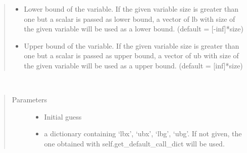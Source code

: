 \documentclass[letterpaper,10pt,english]{sphinxmanual}
\begin{document}
\begin{fulllineitems}
\begin{fulllineitems}
\begin{quote}
\begin{description}
\begin{itemize}
\item {} 
 \textendash{} Lower bound of the variable. If the given variable size is greater than one but a scalar is passed as
lower bound, a vector of lb with size of the given variable will be used as a lower bound.
(default = {[}-inf{]}*size)

\item {} 
 \textendash{} Upper bound of the variable. If the given variable size is greater than one but a scalar is passed as
upper bound, a vector of ub  with size of the given variable will be used as a upper bound.
(default = {[}inf{]}*size)

\end{itemize}

\end{description}\end{quote}

\end{fulllineitems}


\begin{fulllineitems}
\label{\detokenize{yaocptool.optimization:yaocptool.optimization.abstract_optimization_problem.AbstractOptimizationProblem.set_objective}}
\end{fulllineitems}


\begin{fulllineitems}
\label{\detokenize{yaocptool.optimization:yaocptool.optimization.abstract_optimization_problem.AbstractOptimizationProblem.solve}}~\begin{quote}\begin{description}
\item[{Parameters}] \leavevmode\begin{itemize}
\item {} 
 \textendash{} Initial guess

\item {} 
 \textendash{} a dictionary containing ‘lbx’, ‘ubx’, ‘lbg’, ‘ubg’. If not given, the one obtained with
self.get\_default\_call\_dict will be used.


\end{itemize}
\end{description}
\end{quote}
\end{fulllineitems}
\end{fulllineitems}
\end{document}
